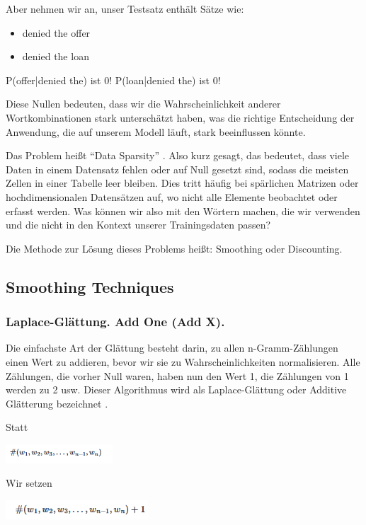 \documentclass[12pt]{article}
\begin{document}
Aber nehmen wir an, unser Testsatz enthält Sätze wie:
\begin{itemize}
	\item denied the offer
	\item denied the loan
\end{itemize}

P(offer|denied the) ist 0!
P(loan|denied the) ist 0!

Diese Nullen bedeuten, dass wir die Wahrscheinlichkeit anderer Wortkombinationen stark unterschätzt haben, was die richtige Entscheidung der Anwendung, die auf unserem Modell läuft, stark beeinflussen könnte.

Das Problem heißt “Data Sparsity” \cite{dremio2023}. Also kurz gesagt, das bedeutet, dass viele Daten in einem Datensatz fehlen oder auf Null gesetzt sind, sodass die meisten Zellen in einer Tabelle leer bleiben. Dies tritt häufig bei spärlichen Matrizen oder hochdimensionalen Datensätzen auf, wo nicht alle Elemente beobachtet oder erfasst werden. Was können wir also mit den Wörtern machen, die wir verwenden und die nicht in den Kontext unserer Trainingsdaten passen?

Die Methode zur Lösung dieses Problems heißt: Smoothing oder Discounting.

\subsection{Smoothing Techniques}
\subsubsection{Laplace-Glättung. Add One (Add X).}
Die einfachste Art der Glättung besteht darin, zu allen n-Gramm-Zählungen einen Wert zu addieren, bevor wir sie zu Wahrscheinlichkeiten normalisieren. Alle Zählungen, die vorher Null waren, haben nun den Wert 1, die Zählungen von 1 werden zu 2 usw. Dieser Algorithmus wird als Laplace-Glättung oder Additive Glätterung bezeichnet \cite{foster2020}.

Statt
\begin{center}
	\includegraphics[width=0.3\textwidth]{statics/Borisov/1.PNG}
\end{center}

Wir setzen
\begin{center}
	\includegraphics[width=0.4\textwidth]{statics/Borisov/2.PNG}
\end{center}
\end{document}
